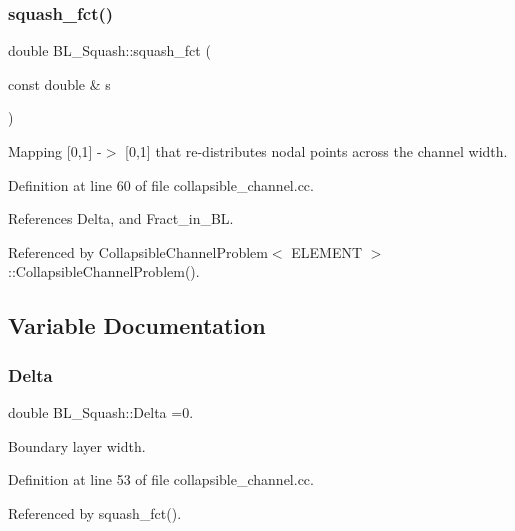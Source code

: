 \subsubsection{\texorpdfstring{squash\+\_\+fct()}{squash\_fct()}}
{\footnotesize\ttfamily double B\+L\+\_\+\+Squash\+::squash\+\_\+fct (\begin{DoxyParamCaption}\item[{const double \&}]{s }\end{DoxyParamCaption})}



Mapping \mbox{[}0,1\mbox{]} -\/$>$ \mbox{[}0,1\mbox{]} that re-\/distributes nodal points across the channel width. 



Definition at line 60 of file collapsible\+\_\+channel.\+cc.



References Delta, and Fract\+\_\+in\+\_\+\+BL.



Referenced by Collapsible\+Channel\+Problem$<$ E\+L\+E\+M\+E\+N\+T $>$\+::\+Collapsible\+Channel\+Problem().



\subsection{Variable Documentation}
\mbox{\label{namespaceBL__Squash_a3c4183891049bca81f3a011db24fc579}} 
\subsubsection{\texorpdfstring{Delta}{Delta}}
{\footnotesize\ttfamily double B\+L\+\_\+\+Squash\+::\+Delta =0.}



Boundary layer width. 



Definition at line 53 of file collapsible\+\_\+channel.\+cc.



Referenced by squash\+\_\+fct().

\mbox{\label{namespaceBL__Squash_af84bda39008884cd2b01e630957573df}} 
